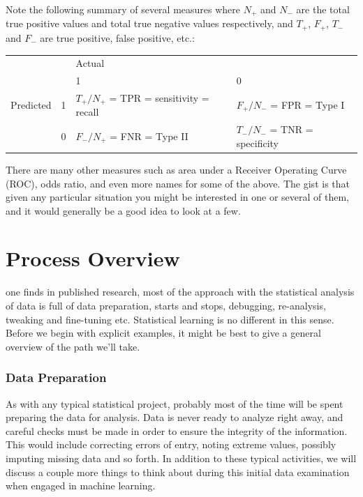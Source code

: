 \documentclass[english,nohyper,titlepage]{tufte-handout}\usepackage{knitr}
\begin{document}
Note the following summary of several measures where $N_+$ and $N_-$ are the total true positive values and total true negative values respectively, and $T_+$, $F_+$, $T_-$ and $F_-$ are true positive, false positive, etc.:
\vspace{.25cm}

{\footnotesize
\noindent\begin{tabular}{llll}
&  & Actual  & \\
& & 1 & 0 \\
\hline
Predicted & 1 & $T_+/N_+$ = TPR = sensitivity = recall & $F_+/N_-$ = FPR = Type I \\
& 0 & $F_-/N_+$ = FNR = Type II & $T_-/N_-$ = TNR = specificity \\
\hline
\end{tabular} 
}


\vspace{.25cm}
There are many other measures such as area under a Receiver Operating Curve (ROC), odds ratio, and even more names for some of the above.  The gist is that given any particular situation you might be interested in one or several of them, and it would generally be a good idea to look at a few.







\part{Process Overview}
 one finds in published research, most of the approach with the statistical analysis of data is full of data preparation, starts and stops, debugging, re-analysis, tweaking and fine-tuning etc. Statistical learning is no different in this sense.  Before we begin with explicit examples, it might be best to give a general overview of the path we'll take.

\section{Data Preparation}
As with any typical statistical project, probably most of the time will be spent preparing the data for analysis.  Data is never ready to analyze right away, and careful checks must be made in order to ensure the integrity of the information.  This would include correcting errors of entry, noting extreme values, possibly imputing missing data and so forth.  In addition to these typical activities, we will discuss a couple more things to think about during this initial data examination when engaged in machine learning.
\end{document}
